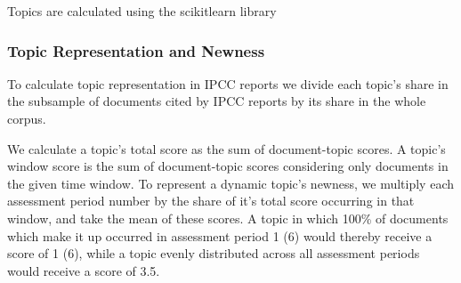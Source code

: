 \documentclass{article}
\begin{document}
\begin{linenumbers}
	Topics are calculated using the scikitlearn library \cite{Pedregosa2011}
		
	\subsubsection*{Topic Representation and Newness}
	
	To calculate topic representation in IPCC reports we divide each topic's share in the subsample of documents cited by IPCC reports by its share in the whole corpus. 
	
	We calculate a topic's total score as the sum of document-topic scores. A topic's window score is the sum of document-topic scores considering only documents in the given time window. To represent a dynamic topic's newness, we multiply each assessment period number by the share of it's total score occurring in that window, and take the mean of these scores. A topic in which 100\% of documents which make it up occurred in assessment period 1 (6) would thereby receive a score of 1 (6), while a topic evenly distributed across all assessment periods would receive a score of 3.5.
	
	
	
	
		
	\end{linenumbers}

\linespread{1}


\end{document}
